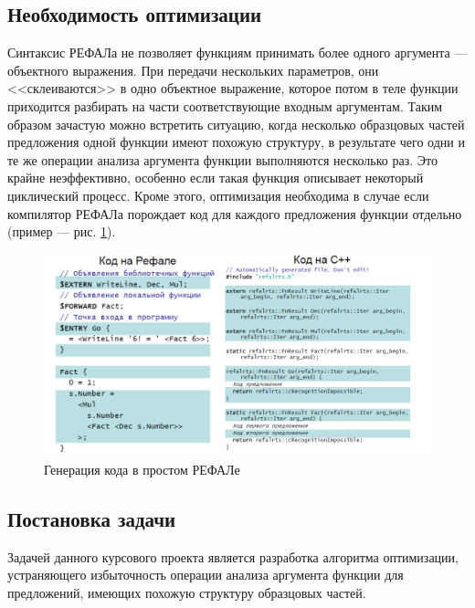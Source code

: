 \documentclass[12pt]{article}
\begin{document}
\subsection[Необходимость оптимизации]{\large Необходимость оптимизации}
\hspace{\parindent} Синтаксис РЕФАЛа не позволяет функциям принимать более одного аргумента --- объектного выражения. При передачи нескольких параметров, они <<склеиваются>> в одно объектное выражение, которое потом в теле функции приходится разбирать на части соответствующие входным аргументам. Таким образом зачастую можно встретить ситуацию, когда несколько образцовых частей предложения одной функции имеют похожую структуру, в результате чего одни и те же операции анализа аргумента функции выполняются несколько раз. Это крайне неэффективно, особенно если такая функция описывает некоторый циклический процесс. Кроме этого, оптимизация необходима в случае если компилятор РЕФАЛа порождает код для каждого предложения функции отдельно (пример --- рис. \ref{fig:code_gen}).

\begin{figure}[h!]
\centering
\includegraphics[width=1\linewidth]{./chapter1/code_gen}
\caption{Генерация кода в простом РЕФАЛе}
\label{fig:code_gen}
\end{figure}


\subsection[Постановка задачи]{\large Постановка задачи}
\hspace{\parindent}Задачей данного курсового проекта является разработка алгоритма оптимизации, устраняющего избыточность операции анализа аргумента функции для предложений, имеющих похожую структуру образцовых частей.

\newpage
\end{document}
